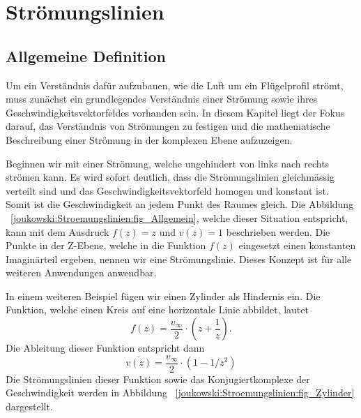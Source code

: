 \section{Strömungslinien}



	
\label{joukowski:sec:stroemungslinien}
	\subsection{Allgemeine Definition}
		
		
		Um ein Verständnis dafür aufzubauen, wie die Luft um ein Flügelprofil strömt, muss zunächst ein grundlegendes Verständnis einer Strömung sowie ihres Geschwindigkeitsvektorfeldes vorhanden sein. In diesem Kapitel liegt der Fokus darauf, das Verständnis von Strömungen zu festigen und die mathematische Beschreibung einer Strömung in der komplexen Ebene aufzuzeigen.
		
		Beginnen wir mit einer Strömung, welche ungehindert von links nach rechts strömen kann. Es wird sofort deutlich, dass die Strömungslinien gleichmässig verteilt sind und das Geschwindigkeitsvektorfeld homogen und konstant ist. Somit ist die Geschwindigkeit an jedem Punkt des Raumes gleich. Die Abbildung ~\eqref{joukowski:Stroemungslinien:fig_Allgemein}, welche dieser Situation entspricht, kann mit dem Ausdruck $f(z) = z$ und $\overline{v(z)} = 1$ beschrieben werden. Die Punkte in der Z-Ebene, welche in die Funktion $f(z)$ eingesetzt einen konstanten Imaginärteil ergeben, nennen wir eine Strömungslinie. Dieses Konzept ist für alle weiteren Anwendungen anwendbar.
		
		In einem weiteren Beispiel fügen wir einen Zylinder als Hindernis ein. Die Funktion, welche einen Kreis auf eine horizontale Linie abbildet, lautet
		\begin{equation}
			\label{joukowski:Stroemungslinien:equation_zylinder}
			f(z) =\frac{v_\infty}{2}\cdot( z+\frac{1}{z}).
		\end{equation} Die Ableitung dieser Funktion entspricht dann
			\begin{equation}
			\label{joukowski:Stroemungslinien:equation_zylinder_speed}
			\overline{v(z)} = \frac{v_\infty}{2}\cdot (1 - 1/z^2)
			\end{equation}  Die Strömungslinien dieser Funktion sowie das Konjugiertkomplexe der Geschwindigkeit werden in Abbildung ~\eqref{joukowski:Stroemungslinien:fig_Zylinder} dargestellt.
	 

